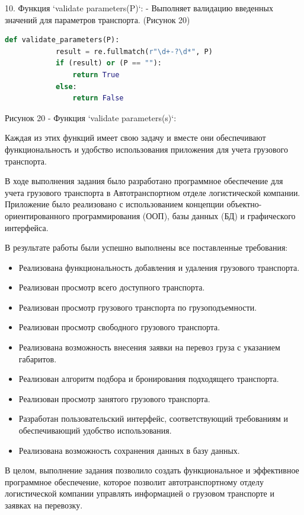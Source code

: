 \documentclass[14pt]{extreport}
\begin{document}
10. Функция `validate parameters(P)`:
    - Выполняет валидацию введенных значений для параметров транспорта. (Рисунок 20)
    \begin{lstlisting}[language=Python]
        def validate_parameters(P):
            result = re.fullmatch(r"\d+-?\d*", P)
            if (result) or (P == ""):
                return True
            else:
                return False
    \end{lstlisting}
    \begin{center}
        Рисунок 20 - Функция `validate parameters(s)`:
    \end{center}
Каждая из этих функций имеет свою задачу и вместе они обеспечивают функциональность и удобство использования приложения для учета грузового транспорта.

\conclusions

В ходе выполнения задания было разработано программное обеспечение для учета грузового транспорта в Автотранспортном отделе логистической компании. Приложение было реализовано с использованием концепции объектно-ориентированного программирования (ООП), базы данных (БД) и графического интерфейса.

В результате работы были успешно выполнены все поставленные требования:
\begin{itemize}
    \item Реализована функциональность добавления и удаления грузового транспорта.
    \item Реализован просмотр всего доступного транспорта.
    \item Реализован просмотр грузового транспорта по грузоподъемности.
    \item Реализован просмотр свободного грузового транспорта.
    \item Реализована возможность внесения заявки на перевоз груза с указанием габаритов.
    \item Реализован алгоритм подбора и бронирования подходящего транспорта.
    \item Реализован просмотр занятого грузового транспорта.
    \item Разработан пользовательский интерфейс, соответствующий требованиям и обеспечивающий удобство использования.
    \item Реализована возможность сохранения данных в базу данных.
\end{itemize}

В целом, выполнение задания позволило создать функциональное и эффективное программное обеспечение, которое позволит автотранспортному отделу логистической компании управлять информацией о грузовом транспорте и заявках на перевозку.
\end{document}
